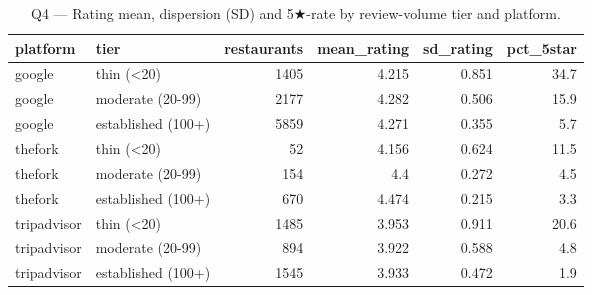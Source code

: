 \begin{table}[ht]
\centering
\caption{Q4 — Rating mean, dispersion (SD) and 5★-rate by review-volume tier and platform.}
\label{tab:q4_volatility_by_tier}
{\tiny
\begin{tabular}{llrrrr}
\toprule
platform & tier & restaurants & mean\_rating & sd\_rating & pct\_5star \\
\midrule
google & thin (<20) & 1405 & 4.215 & 0.851 & 34.7 \\
google & moderate (20-99) & 2177 & 4.282 & 0.506 & 15.9 \\
google & established (100+) & 5859 & 4.271 & 0.355 & 5.7 \\
thefork & thin (<20) & 52 & 4.156 & 0.624 & 11.5 \\
thefork & moderate (20-99) & 154 & 4.4 & 0.272 & 4.5 \\
thefork & established (100+) & 670 & 4.474 & 0.215 & 3.3 \\
tripadvisor & thin (<20) & 1485 & 3.953 & 0.911 & 20.6 \\
tripadvisor & moderate (20-99) & 894 & 3.922 & 0.588 & 4.8 \\
tripadvisor & established (100+) & 1545 & 3.933 & 0.472 & 1.9 \\
\bottomrule
\end{tabular}
}
\end{table}
